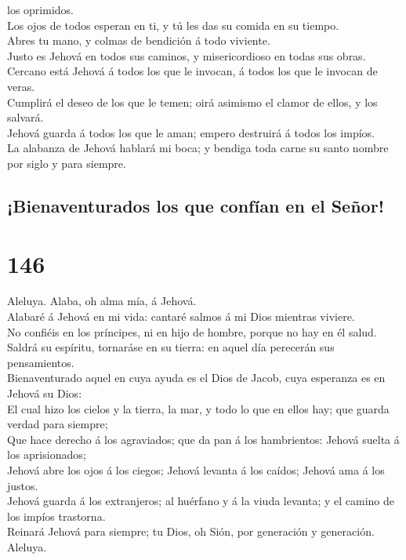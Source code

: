 los oprimidos.\\
 Los ojos de todos esperan en ti, y tú les das su comida
en su tiempo.\\
 Abres tu mano, y colmas de bendición á todo viviente.\\
 Justo es Jehová en todos sus caminos, y misericordioso
en todas sus obras.\\
 Cercano está Jehová á todos los que le invocan, á todos
los que le invocan de veras.\\
 Cumplirá el deseo de los que le temen; oirá asimismo el
clamor de ellos, y los salvará.\\
 Jehová guarda á todos los que le aman; empero destruirá
á todos los impíos.\\
 La alabanza de Jehová hablará mi boca; y bendiga toda
carne su santo nombre por siglo y para siempre.

\hypertarget{bienaventurados-los-que-confuxedan-en-el-seuxf1or}{%
\subsection{¡Bienaventurados los que confían en el
Señor!}\label{bienaventurados-los-que-confuxedan-en-el-seuxf1or}}

\hypertarget{section-145}{%
\section{146}\label{section-145}}

 Aleluya. Alaba, oh alma mía, á Jehová.\\
 Alabaré á Jehová en mi vida: cantaré salmos á mi Dios
mientras viviere.\\
 No confiéis en los príncipes, ni en hijo de hombre,
porque no hay en él salud.\\
 Saldrá su espíritu, tornaráse en su tierra: en aquel día
perecerán sus pensamientos.\\
 Bienaventurado aquel en cuya ayuda es el Dios de Jacob,
cuya esperanza es en Jehová su Dios:\\
 El cual hizo los cielos y la tierra, la mar, y todo lo
que en ellos hay; que guarda verdad para siempre;\\
 Que hace derecho á los agraviados; que da pan á los
hambrientos: Jehová suelta á los aprisionados;\\
 Jehová abre los ojos á los ciegos; Jehová levanta á los
caídos; Jehová ama á los justos.\\
 Jehová guarda á los extranjeros; al huérfano y á la viuda
levanta; y el camino de los impíos trastorna.\\
 Reinará Jehová para siempre; tu Dios, oh Sión, por
generación y generación. Aleluya.

